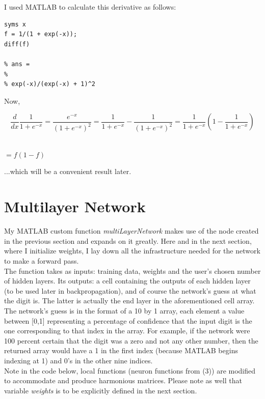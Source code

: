 \documentclass[letterpaper,11pt]{article}
\begin{document}
I used MATLAB to calculate this derivative as follows:\\

\begin{verbatim}
syms x
f = 1/(1 + exp(-x));
diff(f)

% ans =
%
% exp(-x)/(exp(-x) + 1)^2
\end{verbatim}

Now,


\[\frac{d}{dx} \frac{1}{1 + e^{-x}} = \frac{e^{-x}}{{(1 + e^{-x})}^2} = \frac{1}{1 + e^{-x}} - \frac{1}{{(1 + e^{-x})}^2} = \frac{1}{1 + e^{-x}}\left(1 - \frac{1}{1 + e^{-x}}\right)\]\

$= f(1-f)$

\vspace{5mm}
...which will be a convenient result later.



\section{Multilayer Network}

My MATLAB custom function \emph{multiLayerNetwork} makes use of the node created in the previous section and expands on it greatly. Here and in the next section, where I initialize weights, I lay down all the infrastructure needed for the network to make a forward pass.\\

The function takes as inputs: training data, weights and the user's chosen number of hidden layers. Its outputs: a cell containing the outputs of each hidden layer (to be used later in backpropagation), and of course the network's guess at what the digit is. The latter is actually the end layer in the aforementioned cell array. The network's guess is in the format of a 10 by 1 array, each element a value between [0,1] representing a percentage of confidence that the input digit is the one corresponding to that index in the array. For example, if the network were 100 percent certain that the digit was a zero and not any other number, then the returned array would have a 1 in the first index (because MATLAB begins indexing at 1) and 0's in the other nine indices.\\

Note in the code below, local functions (neuron functions from (3)) are modified to accommodate and produce harmonious matrices. Please note as well that variable \emph{weights} is to be explicitly defined in the next section.
\end{document}
